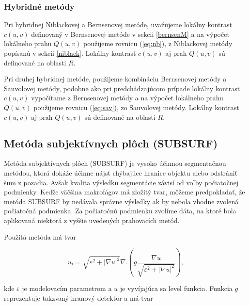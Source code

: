 \documentclass[a4paper,11pt,oneside]{article}%
\def\epsilon{\varepsilon}
\begin{document}
\subsubsection{Hybridné metódy}

Pri hybridnej Niblackovej a Bernsenovej metóde\cite{hybridNBaBren}, uvažujeme lokálny kontrast $c(u, v)$ definovaný v Bernsenovej metóde v sekcii \ref{bernsenM} a na výpočet lokálneho prahu $Q(u, v)$ použijeme rovnicu (\ref{eq:nb}), z Niblackovej metódy popísanú v sekcii \ref{niblack}. Lokálny kontrast $c(u, v)$ aj prah $Q(u, v)$ sú definované na oblasti $R$.

Pri druhej hybridnej metóde, použijeme kombináciu Bernsenovej metódy a Sauvolovej metódy\cite{hybridNBaBren}, podobne ako pri predchádzajúcom prípade lokálny kontrast $c(u, v)$ vypočítame z Bernsenovej metódy a na výpočet lokálneho prahu $Q(u, v)$ použijeme rovnicu (\ref{eq:sav}), zo Sauvolovej metódy. Lokálny kontrast $c(u, v)$ aj prah $Q(u, v)$ sú definované na oblasti $R$.

\subsection{Metóda subjektívnych plôch (SUBSURF)} 

Metóda subjektívnych plôch (SUBSURF) je vysoko účinnou segmentačnou metódou, ktorá dokáže účinne nájsť chýbajúce hranice objektu alebo odstrániť šum z pozadia. Avšak kvalita výsledku segmentácie závisí od voľby počiatočnej podmienky. Keďže väčšina makrofágov má zložitý tvar, môžeme predpokladať, že metóda SUBSURF by nedávala správne výsledky ak by nebola vhodne zvolená počiatočná podmienka. Za počiatočnú podmienku zvolíme dáta, na ktoré bola aplikovaná niektorá z vyššie uvedených prahovacích metód.

Použitá metóda má tvar

\begin{equation} \label{eq:subsurf}
u_t = \sqrt{\epsilon^2 + |\nabla u|^2}\nabla.(g \frac{\nabla u}{\sqrt{\epsilon^2 + |\nabla u|^2}}),
\end{equation}

kde $\epsilon$ je modelovacím parametrom a $u$ je vyvíjajúca sa level funkcia. Funkcia $g$ reprezentuje takzvaný hranový detektor a má tvar
\end{document}
